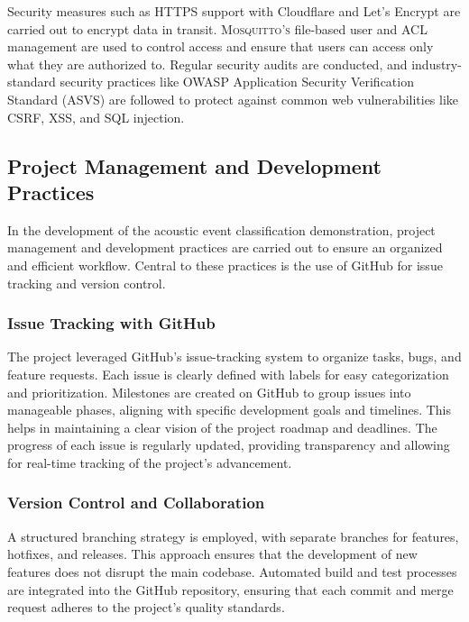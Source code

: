Security measures such as HTTPS support with Cloudflare and Let's Encrypt are carried out to encrypt data in transit. \textsc{Mosquitto’s} file-based user and ACL management are used to control access and ensure that users can access only what they are authorized to. Regular security audits are conducted, and industry-standard security practices like OWASP Application Security Verification Standard (ASVS) are followed to protect against common web vulnerabilities like CSRF, XSS, and SQL injection.

\subsection{Project Management and Development Practices}
In the development of the acoustic event classification demonstration, project management and development practices are carried out to ensure an organized and efficient workflow. Central to these practices is the use of GitHub for issue tracking and version control.

\subsubsection{Issue Tracking with GitHub}
The project leveraged GitHub's issue-tracking system to organize tasks, bugs, and feature requests. Each issue is clearly defined with labels for easy categorization and prioritization. Milestones are created on GitHub to group issues into manageable phases, aligning with specific development goals and timelines. This helps in maintaining a clear vision of the project roadmap and deadlines. The progress of each issue is regularly updated, providing transparency and allowing for real-time tracking of the project's advancement.

\subsubsection{Version Control and Collaboration}
A structured branching strategy is employed, with separate branches for features, hotfixes, and releases. This approach ensures that the development of new features does not disrupt the main codebase. Automated build and test processes are integrated into the GitHub repository, ensuring that each commit and merge request adheres to the project's quality standards.